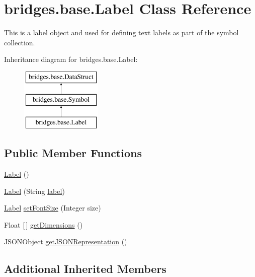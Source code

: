 \hypertarget{classbridges_1_1base_1_1_label}{}\section{bridges.\+base.\+Label Class Reference}
\label{classbridges_1_1base_1_1_label}


This is a label object and used for defining text labels as part of the symbol collection.  


Inheritance diagram for bridges.\+base.\+Label\+:\begin{figure}[H]
\begin{center}
\leavevmode
\includegraphics[height=3.000000cm]{classbridges_1_1base_1_1_label}
\end{center}
\end{figure}
\subsection*{Public Member Functions}
\begin{DoxyCompactItemize}
\item 
\mbox{\hyperlink{classbridges_1_1base_1_1_label_adaed1c29dc02eb0f77d772b256b9eae4}{Label}} ()
\item 
\mbox{\hyperlink{classbridges_1_1base_1_1_label_a0ffb2cdafae3f2c21e0925f2fe23df87}{Label}} (String \mbox{\hyperlink{classbridges_1_1base_1_1_symbol_ad2adcc82e6a96c2f3c465702502655e9}{label}})
\item 
\mbox{\hyperlink{classbridges_1_1base_1_1_label}{Label}} \mbox{\hyperlink{classbridges_1_1base_1_1_label_ab5f2d60e519db2499f326c4ccb967b25}{set\+Font\+Size}} (Integer size)
\item 
Float \mbox{[}$\,$\mbox{]} \mbox{\hyperlink{classbridges_1_1base_1_1_label_a9df9f801df020ba601a7bd33f38b4b0f}{get\+Dimensions}} ()
\item 
J\+S\+O\+N\+Object \mbox{\hyperlink{classbridges_1_1base_1_1_label_a6befc6655ce36868213be289571c6315}{get\+J\+S\+O\+N\+Representation}} ()
\end{DoxyCompactItemize}
\subsection*{Additional Inherited Members}


